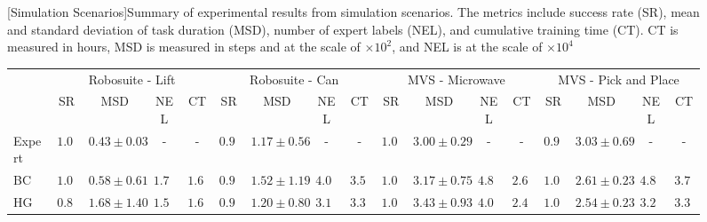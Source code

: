 \begin{figure*}[htb]
\vspace{1em}

\begin{minipage}{\textwidth}
    \centering
    \renewcommand\arraystretch{1.2}
    \setlength{\tabcolsep}{1.1pt}
    [Simulation Scenarios]{Summary of experimental results from simulation scenarios. The metrics include success rate (SR), mean and standard deviation of task duration (MSD), number of expert labels (NEL), and cumulative training time (CT). CT is measured in hours, MSD is measured in steps and at the scale of $\times 10^{2}$, and NEL is at the scale of $\times 10^{4}$}
    \label{tab:sim_scenarios}
    
    \begin{tabular}{l|cccc|cccc|cccc|cccc}
        \hline
        & \multicolumn{4}{c|}{Robosuite - Lift} & \multicolumn{4}{c|}{Robosuite - Can} &  \multicolumn{4}{c|}{MVS - Microwave} & \multicolumn{4}{c}{MVS - Pick and Place} \\
        \cline{2-17}
        & SR & MSD & NEL & CT & SR & MSD & NEL & CT & SR & MSD & NEL & CT & SR & MSD & NEL & CT\\
        \hline          %
        Expert & $1.00$ & $0.43 \pm 0.03$ & - & - 
               & $0.98$ & $1.17 \pm 0.56$ & - & -  
               & $1.00$ & $3.00 \pm 0.29$ & - & - 
               & $0.92$ & $3.03 \pm 0.69$ & - & - \\

        BC & $\mathbf{1.00}$ & $0.58 \pm 0.61$ & $1.71$ & $1.66$
            & $0.90$ & $1.52 \pm 1.19$ & $4.06$ & $3.56$
            & $\mathbf{1.00}$ & $3.17 \pm 0.75$ & $4.85$ & $2.66$
            & $\mathbf{1.00}$ & $2.61 \pm 0.23$ & $4.86$ & $3.76$\\  
            
        HG & $0.88$ & $1.68 \pm 1.40$ & $1.58$ & $1.62$
           & $\mathbf{0.96}$ & $\mathbf{1.20 \pm 0.80}$ & $\mathbf{3.15}$ & $3.30$  
           & $\mathbf{1.00}$ & $3.43 \pm 0.93$ & $4.01$ & $2.41$  
           & $\mathbf{1.00}$ & $\mathbf{2.54 \pm 0.23}$ & $3.26$ & $3.30$\\  


\end{tabular}
\end{minipage}
\end{figure*}
